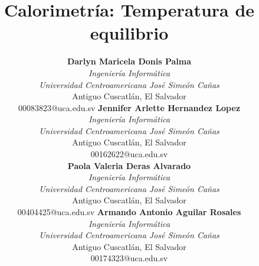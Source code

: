 \documentclass[conference]{IEEEtran}
\begin{document}
\title{Calorimetría: Temperatura de equilibrio}

\author{
\begin{tabular}{@{}c@{\hspace{0.07\textwidth}}c@{}}
\parbox[t]{0.43\textwidth}{\centering
  {\normalsize\textbf{Darlyn Maricela Donis Palma}}\\
  {\small \textit{Ingeniería Informática}\\
  \textit{Universidad Centroamericana José Simeón Cañas}\\
  Antiguo Cuscatlán, El Salvador\\
  00083823@uca.edu.sv}
}
&
\parbox[t]{0.43\textwidth}{\centering
  {\normalsize\textbf{Jennifer Arlette Hernandez Lopez}}\\
  {\small \textit{Ingeniería Informática}\\
  \textit{Universidad Centroamericana José Simeón Cañas}\\
  Antiguo Cuscatlán, El Salvador\\
  00162622@uca.edu.sv}
}\\[10.0ex]
\parbox[t]{0.43\textwidth}{\centering
  {\normalsize\textbf{Paola Valeria Deras Alvarado}}\\
  {\small \textit{Ingeniería Informática}\\
  \textit{Universidad Centroamericana José Simeón Cañas}\\
  Antiguo Cuscatlán, El Salvador\\
  00404425@uca.edu.sv}
}
&
\parbox[t]{0.43\textwidth}{\centering
  {\normalsize\textbf{Armando Antonio Aguilar Rosales}}\\
  {\small \textit{Ingeniería Informática}\\
  \textit{Universidad Centroamericana José Simeón Cañas}\\
  Antiguo Cuscatlán, El Salvador\\
  00174323@uca.edu.sv}
}
\end{tabular}
}

\maketitle












\end{document}
